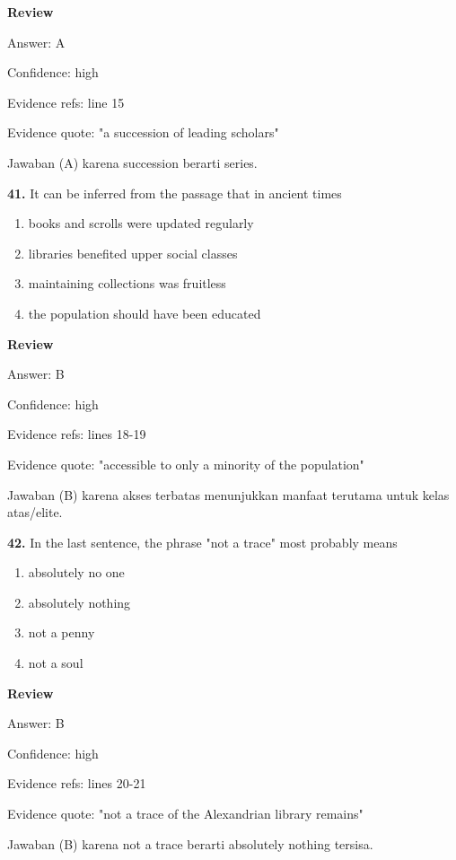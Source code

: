 \documentclass[12pt]{article}
\begin{document}
\begingroup
\setlength{\parskip}{0pt}
\setlength{\parindent}{0pt}
\textbf{Review}\par
Answer: A\par
Confidence: high\par
Evidence refs: line 15\par
Evidence quote: "a succession of leading scholars"\par
Jawaban (A) karena succession berarti series.\par
\endgroup
\par
\vspace{0.25\baselineskip}
\noindent\textbf{41.} It can be inferred from the passage that in ancient times
\begin{enumerate}[label=(\Alph*),leftmargin=*,itemsep=0.2em]
\item books and scrolls were updated regularly
\item libraries benefited upper social classes
\item maintaining collections was fruitless
\item the population should have been educated
\end{enumerate}
\par
\begingroup
\setlength{\parskip}{0pt}
\setlength{\parindent}{0pt}
\textbf{Review}\par
Answer: B\par
Confidence: high\par
Evidence refs: lines 18-19\par
Evidence quote: "accessible to only a minority of the population"\par
Jawaban (B) karena akses terbatas menunjukkan manfaat terutama untuk kelas atas/elite.\par
\endgroup
\par
\vspace{0.25\baselineskip}
\noindent\textbf{42.} In the last sentence, the phrase "not a trace" most probably means
\begin{enumerate}[label=(\Alph*),leftmargin=*,itemsep=0.2em]
\item absolutely no one
\item absolutely nothing
\item not a penny
\item not a soul
\end{enumerate}
\par
\begingroup
\setlength{\parskip}{0pt}
\setlength{\parindent}{0pt}
\textbf{Review}\par
Answer: B\par
Confidence: high\par
Evidence refs: lines 20-21\par
Evidence quote: "not a trace of the Alexandrian library remains"\par
Jawaban (B) karena not a trace berarti absolutely nothing tersisa.\par
\endgroup
\par
\vspace{0.25\baselineskip}
\end{document}
